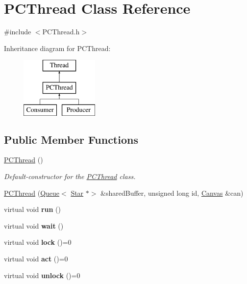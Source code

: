 \hypertarget{class_p_c_thread}{}\section{P\+C\+Thread Class Reference}
\label{class_p_c_thread}


{\ttfamily \#include $<$P\+C\+Thread.\+h$>$}

Inheritance diagram for P\+C\+Thread\+:\begin{figure}[H]
\begin{center}
\leavevmode
\includegraphics[height=3.000000cm]{class_p_c_thread}
\end{center}
\end{figure}
\subsection*{Public Member Functions}
\begin{DoxyCompactItemize}
\item 
\hyperlink{class_p_c_thread_a7ae0244c033e4202d2643544432f91f7}{P\+C\+Thread} ()
\begin{DoxyCompactList}\small\item\em Default-\/constructor for the \hyperlink{class_p_c_thread}{P\+C\+Thread} class. \end{DoxyCompactList}\item 
\hyperlink{class_p_c_thread_abe06615f59879c19d703a93889f5e7cc}{P\+C\+Thread} (\hyperlink{class_queue}{Queue}$<$ \hyperlink{classtsgl_1_1_star}{Star} $\ast$$>$ \&shared\+Buffer, unsigned long id, \hyperlink{classtsgl_1_1_canvas}{Canvas} \&can)
\item 
\mbox{\label{class_p_c_thread_a57df324beabfba54ebee6a7c59bf49ef}} 
virtual void {\bfseries run} ()
\item 
\mbox{\label{class_p_c_thread_a7ca73de5a86008e76797ad134bca5f33}} 
virtual void {\bfseries wait} ()
\item 
\mbox{\label{class_p_c_thread_a7a8bb7e11ecc298ae012f4393902c58c}} 
virtual void {\bfseries lock} ()=0
\item 
\mbox{\label{class_p_c_thread_ada80e2193c24b9111eb21abd07b2e2a1}} 
virtual void {\bfseries act} ()=0
\item 
\mbox{\label{class_p_c_thread_a6266054bfef3bae0fceeefe00f64cc17}} 
virtual void {\bfseries unlock} ()=0
\end{DoxyCompactItemize}
